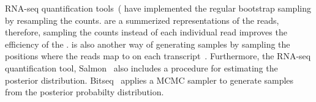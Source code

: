 RNA-seq quantification tools~(\cite{kallisto,salmon} have implemented the regular bootstrap 
sampling by resampling the \eqc counts. \eqcs are a summerized representations of the reads, 
therefore, sampling the \eqc counts instead of each individual read improves the efficiency 
of the \boots. \pboots is also another way of generating \boot samples by sampling the 
positions where the reads map to on each transcript~\cite{xiong2016probabilistic}.
Furthermore, the RNA-seq quantification tool, Salmon~\cite{salmon} also includes a \gibbs
procedure for estimating the posterior distribution.  Bitseq~\cite{glaus2012identifying} 
applies a MCMC \gib sampler to generate samples from the posterior probabilty distribution. 